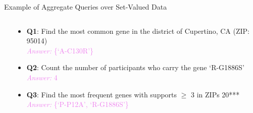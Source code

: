 \documentclass[xcolor={dvipsnames},aspectratio=169,10pt]{beamer}
\begin{document}
\begin{frame}[fragile]{Example of Aggregate Queries over Set-Valued Data}
  \begin{columns}
    \begin{column}{.5\linewidth}
      \begin{table}
        \caption{Set-Valued Genome Dataset~\cite{pgp}}
      \end{table}
    \end{column}%
    \begin{column}{.5\linewidth}
      \begin{itemize}[<+(1)->]%
        \item \textbf{Q1}: Find the most common gene in the district of Cupertino, CA (ZIP\@: 95014) \\
          \textcolor{Violet}{\emph{Answer:} \{`A-C130R'\}}
        \item \textbf{Q2}: Count the number of participants who carry the gene `R-G1886S' \\
          \textcolor{Violet}{\emph{Answer:} 4}
        \item \textbf{Q3}: Find the most frequent genes with supports $\ge$ 3 in ZIPs 20*** \\
          \textcolor{Violet}{\emph{Answer:} \{`P-P12A', `R-G1886S'\}}
      \end{itemize}
    \end{column}
  \end{columns}
\end{frame}
\end{document}
